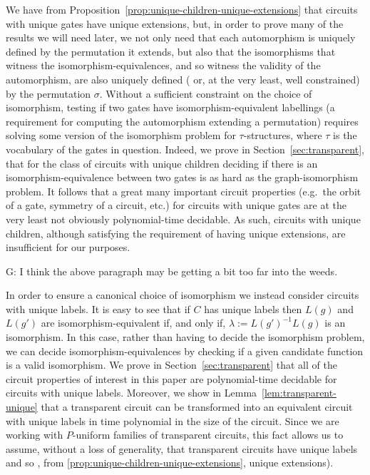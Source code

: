 \documentclass[../paper.tex]{subfiles}
\begin{document}
We have from Proposition~\ref{prop:unique-children-unique-extensions} that
circuits with unique gates have unique extensions, but, in order to prove many
of the results we will need later, we not only need that each automorphism is
uniquely defined by the permutation it extends, but also that the isomorphisms
that witness the isomorphism-equivalences, and so witness the validity of the
automorphism, are also uniquely defined ( or, at the very least, well
constrained) by the permutation $\sigma$. Without a sufficient constraint on the
choice of isomorphism, testing if two gates have isomorphism-equivalent
labellings (a requirement for computing the automorphism extending a
permutation) requires solving some version of the isomorphism problem for
$\tau$-structures, where $\tau$ is the vocabulary of the gates in question.
Indeed, we prove in Section~\ref{sec:transparent}, that for the class of
circuits with unique children deciding if there is an isomorphism-equivalence
between two gates is as hard as the graph-isomorphism problem. It follows that a
great many important circuit properties (e.g.\ the orbit of a gate, symmetry of
a circuit, etc.) for circuits with unique gates are at the very least not
obviously polynomial-time decidable. As such, circuits with unique children,
although satisfying the requirement of having unique extensions, are
insufficient for our purposes.

\begin{drem}
  G: I think the above paragraph may be getting a bit too far into the weeds.
\end{drem}

In order to ensure a canonical choice of isomorphism we instead consider
circuits with unique labels. It is easy to see that if $C$ has unique labels
then $L(g)$ and $L(g')$ are isomorphism-equivalent if, and only if, $\lambda :=
L(g')^{-1}L(g)$ is an isomorphism. In this case, rather than having to decide
the isomorphism problem, we can decide isomorphism-equivalences by checking if a
given candidate function is a valid isomorphism. We prove in
Section~\ref{sec:transparent} that all of the circuit properties of interest in
this paper are polynomial-time decidable for circuits with unique labels.
Moreover, we show in Lemma~\ref{lem:transparent-unique} that a transparent
circuit can be transformed into an equivalent circuit with unique labels in time
polynomial in the size of the circuit. Since we are working with $P$-uniform
families of transparent circuits, this fact allows us to assume, without a loss
of generality, that transparent circuits have unique labels and so , from
\ref{prop:unique-children-unique-extensions}, unique extensions).
\end{document}
